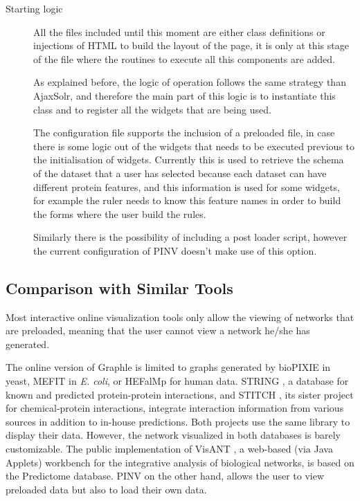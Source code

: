 \begin{description}
\item[Starting logic]
All the files included until this moment are either class definitions or injections of HTML to build the layout of the page, it is only at this stage of the file where the routines to execute all this components are added. 

As explained before, the logic of operation follows the same strategy than AjaxSolr, and therefore the main part of this logic is to instantiate this class and to register all the widgets that are being used.

The configuration file supports the inclusion of a preloaded file, in case there is some logic out of the widgets that needs to be executed previous to the initialisation of widgets. Currently this is used to retrieve the schema of the dataset that a user has selected because each dataset can have different protein features, and this information is used for some widgets, for example the ruler needs to know this feature names in order to build the forms where the user build the rules.

Similarly there is the possibility of including a post loader script, however the current configuration of PINV doesn't make use of this option.
\end{description}


\subsection{Comparison with Similar Tools}
Most interactive online visualization tools only allow the viewing of networks that are preloaded, meaning that the user cannot view a network he/she has generated.

The online version of Graphle \cite{HUT2009} is limited to graphs generated by bioPIXIE in yeast, MEFIT in \emph{E. coli}, or HEFalMp for human data. STRING \cite{FRA2013}, a database for known and predicted protein-protein interactions, and STITCH \cite{KUH2008}, its sister project for chemical-protein interactions, integrate interaction information from various sources in addition to in-house predictions. Both projects use the same library to display their data. However, the network visualized in both databases is barely customizable. The public implementation of VisANT \cite{HU2013}, a web-based  (via Java Applets) workbench for the integrative analysis of biological networks, is based on the Predictome database.  
PINV on the other hand, allows the user to view preloaded data but also to load their own data.

